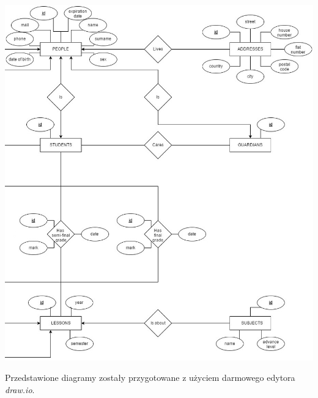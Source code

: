 \documentclass[12pt, titlepage]{article}
\begin{document}
\begin{center}
\includegraphics[scale=0.5]{screeny/diagram2.jpg}
\end{center}


Przedstawione diagramy zostały przygotowane z użyciem darmowego edytora \textit{draw.io}. 
\end{document}

